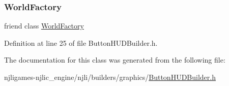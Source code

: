 \subsubsection{\texorpdfstring{World\+Factory}{WorldFactory}}
{\footnotesize\ttfamily friend class \mbox{\hyperlink{classnjli_1_1_world_factory}{World\+Factory}}\hspace{0.3cm}{\ttfamily [friend]}}



Definition at line 25 of file Button\+H\+U\+D\+Builder.\+h.



The documentation for this class was generated from the following file\+:\begin{DoxyCompactItemize}
\item 
njligames-\/njlic\+\_\+engine/njli/builders/graphics/\mbox{\hyperlink{_button_h_u_d_builder_8h}{Button\+H\+U\+D\+Builder.\+h}}\end{DoxyCompactItemize}
